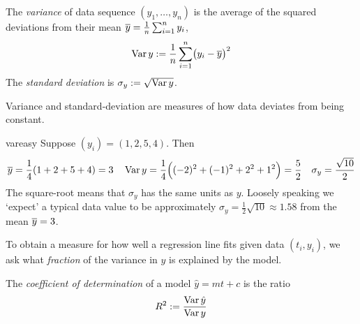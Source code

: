 \begin{defn}{}{}
	The \emph{variance} of data sequence $(y_1,\ldots,y_n)$ is the average of the squared deviations from their mean $\overline{y}=\frac 1n\sum_{i=1}^ny_i$,
	\[
		\operatorname{Var} y:=\frac 1n\sum_{i=1}^n\bigl(y_i-\overline{y}\bigr)^2
	\]
	The \emph{standard deviation} is $\sigma_y:=\sqrt{\operatorname{Var} y}$.
\end{defn}

Variance and standard-deviation are measures of how data deviates from being constant.

\begin{example}{}{vareasy}
	Suppose $(y_i)=(1,2,5,4)$. Then
	\begin{align*}
		&\cl y=\frac 14(1+2+5+4)=3
		&&\Var y=\frac 14\Bigl((-2)^2+(-1)^2+ 2^2+1^2\Bigr) =\frac 52
		&\sigma_y=\frac{\sqrt{10}}2%
	\end{align*}
	The square-root means that $\sigma_y$ has the same units as $y$. Loosely speaking we `expect' a typical data value to be approximately $\sigma_y=\frac 12\sqrt{10}\approx 1.58$ from the mean $\overline{y}=3$.
\end{example}

To obtain a measure for how well a regression line fits given data $(t_i,y_i)$, we ask what \emph{fraction} of the variance in $y$ is explained by the model.

\begin{defn}{}{}
	The \emph{coefficient of determination} of a model $\hat y=mt+c$ is the ratio
	\[
		R^2:=\frac{\operatorname{Var}\hat y}{\operatorname{Var} y}
	\]
\end{defn}

